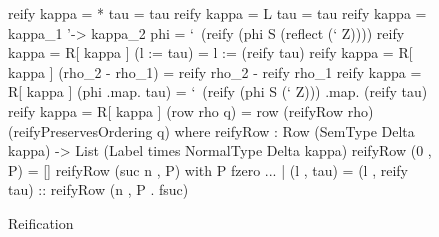 \begin{figure}
\begin{agdaf}
reify {kappa = *} tau = tau 
reify {kappa = L} tau = tau
reify {kappa = kappa_1 '-> kappa_2} phi = 
  `\ (reify (phi S (reflect (` Z)))) 
reify {kappa = R[ kappa ]} (l := tau) = l := (reify tau)
reify {kappa = R[ kappa ]} (rho_2 - rho_1) = reify rho_2 - reify rho_1
reify {kappa = R[ kappa ]} (phi .map. tau) = 
  `\ (reify (phi S (` Z))) .map. (reify tau)
reify {kappa = R[ kappa ]} (row rho q) = 
  row (reifyRow rho) (reifyPreservesOrdering q)
  where
    reifyRow : Row (SemType Delta kappa) -> 
               List (Label times NormalType Delta kappa)
    reifyRow (0 , P) = [] 
    reifyRow (suc n , P) with P fzero 
    ... | (l , tau) = 
      (l , reify tau) :: reifyRow (n , P . fsuc)
\end{agdaf}
\caption{Reification}
\label{fig:reification}
\end{figure}